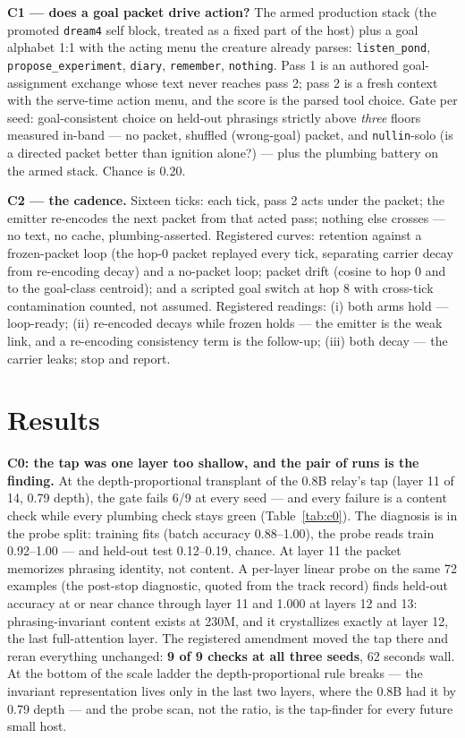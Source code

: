 \documentclass[11pt]{article}
\begin{document}
\textbf{C1 --- does a goal packet drive action?} The armed production
stack (the promoted \texttt{dream4} self block, treated as a fixed
part of the host) plus a goal alphabet 1:1 with the acting menu the
creature already parses: \texttt{listen\_pond}, \texttt{propose\_experiment}, \texttt{diary}, \texttt{remember}, \texttt{nothing}. Pass 1 is an authored goal-assignment
exchange whose text never reaches pass 2; pass 2 is a fresh context with
the serve-time action menu, and the score is the parsed tool choice.
Gate per seed: goal-consistent choice on held-out phrasings strictly
above \emph{three} floors measured in-band --- no packet, shuffled
(wrong-goal) packet, and \texttt{nullin}-solo (is a directed packet
better than ignition alone?) --- plus the plumbing battery on the armed
stack. Chance is 0.20.

\textbf{C2 --- the cadence.} Sixteen ticks: each tick, pass 2 acts
under the packet; the emitter re-encodes the next packet from that acted
pass; nothing else crosses --- no text, no cache, plumbing-asserted.
Registered curves: retention against a frozen-packet loop (the hop-0
packet replayed every tick, separating carrier decay from re-encoding
decay) and a no-packet loop; packet drift (cosine to hop 0 and to the
goal-class centroid); and a scripted goal switch at hop 8 with cross-tick
contamination counted, not assumed. Registered readings: (i) both arms
hold --- loop-ready; (ii) re-encoded decays while frozen holds --- the
emitter is the weak link, and a re-encoding consistency term is the
follow-up; (iii) both decay --- the carrier leaks; stop and report.

\section{Results}

\textbf{C0: the tap was one layer too shallow, and the pair of runs is
the finding.} At the depth-proportional transplant of the 0.8B relay's
tap (layer 11 of 14, 0.79 depth), the gate fails 6/9 at every seed ---
and every failure is a content check while every plumbing check stays
green (Table~\ref{tab:c0}). The diagnosis is in the probe split:
training fits (batch accuracy 0.88--1.00), the probe reads train
0.92--1.00 --- and held-out test 0.12--0.19, chance. At
layer 11 the packet memorizes phrasing identity, not content. A
per-layer linear probe on the same 72 examples (the post-stop
diagnostic, quoted from the track record) finds held-out accuracy at or
near chance through layer 11 and 1.000 at layers 12 and 13:
phrasing-invariant content exists at 230M, and it crystallizes exactly
at layer 12, the last full-attention layer. The registered amendment
moved the tap there and reran everything unchanged: \textbf{9 of 9
checks at all three seeds}, 62 seconds wall.
At the bottom of the scale
ladder the depth-proportional rule breaks --- the invariant
representation lives only in the last two layers, where the 0.8B had it
by 0.79 depth --- and the probe scan, not the ratio, is the tap-finder
for every future small host.
\end{document}
